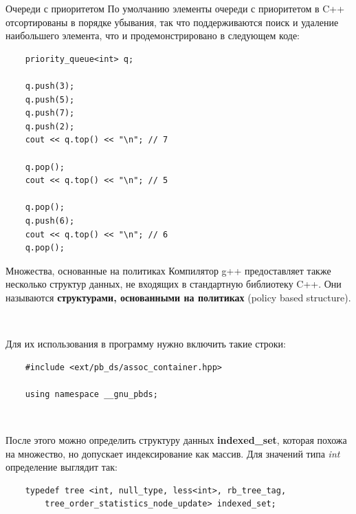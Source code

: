 \documentclass{beamer}
\begin{document}
\begin{frame}[fragile]{Очереди с приоритетом}
    По умолчанию элементы очереди с приоритетом в C++ отсортированы в порядке убывания, так что поддерживаются поиск и удаление наибольшего элемента, что и продемонстрировано в следующем коде:

    \begin{verbatim}
    priority_queue<int> q;
    
    q.push(3);
    q.push(5);
    q.push(7);
    q.push(2);
    cout << q.top() << "\n"; // 7

    q.pop();
    cout << q.top() << "\n"; // 5
    
    q.pop();
    q.push(6);
    cout << q.top() << "\n"; // 6
    q.pop();
    \end{verbatim}
\end{frame}

\begin{frame}[fragile]{Множества, основанные на политиках}
    Компилятор g++ предоставляет также несколько структур данных, не входящих в стандартную библиотеку C++. Они называются \textbf{структурами, основанными на политиках} (policy based structure). 
    
    ~
    
    Для их использования в программу нужно включить такие строки:
    \begin{verbatim}
    #include <ext/pb_ds/assoc_container.hpp>
    
    using namespace __gnu_pbds;
    \end{verbatim}

    ~
    
    После этого можно определить структуру данных \textbf{indexed\_set}, которая похожа на множество, но допускает индексирование как массив. Для значений типа \textit{int} определение выглядит так:
    \begin{verbatim}
    typedef tree <int, null_type, less<int>, rb_tree_tag,
        tree_order_statistics_node_update> indexed_set;
    \end{verbatim}
    \end{frame}
\end{document}
